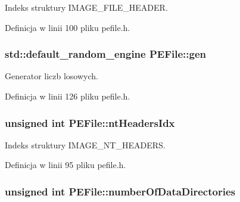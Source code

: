 Indeks struktury I\-M\-A\-G\-E\-\_\-\-F\-I\-L\-E\-\_\-\-H\-E\-A\-D\-E\-R. 



Definicja w linii 100 pliku pefile.\-h.

\hypertarget{class_p_e_file_a2778890ee00bd2ee99f4d5757961f222}{
\subsubsection[{gen}]{\setlength{\rightskip}{0pt plus 5cm}std\-::default\-\_\-random\-\_\-engine P\-E\-File\-::gen\hspace{0.3cm}{\ttfamily [private]}}}\label{class_p_e_file_a2778890ee00bd2ee99f4d5757961f222}


Generator liczb losowych. 



Definicja w linii 126 pliku pefile.\-h.

\hypertarget{class_p_e_file_affd75caf053c5f827b335ea7ac0b1cfa}{
\subsubsection[{nt\-Headers\-Idx}]{\setlength{\rightskip}{0pt plus 5cm}unsigned int P\-E\-File\-::nt\-Headers\-Idx\hspace{0.3cm}{\ttfamily [private]}}}\label{class_p_e_file_affd75caf053c5f827b335ea7ac0b1cfa}


Indeks struktury I\-M\-A\-G\-E\-\_\-\-N\-T\-\_\-\-H\-E\-A\-D\-E\-R\-S. 



Definicja w linii 95 pliku pefile.\-h.

\hypertarget{class_p_e_file_a46392c7d5a4e12bc852674e9b692217e}{
\subsubsection[{number\-Of\-Data\-Directories}]{\setlength{\rightskip}{0pt plus 5cm}unsigned int P\-E\-File\-::number\-Of\-Data\-Directories\hspace{0.3cm}{\ttfamily [private]}}}\label{class_p_e_file_a46392c7d5a4e12bc852674e9b692217e}


